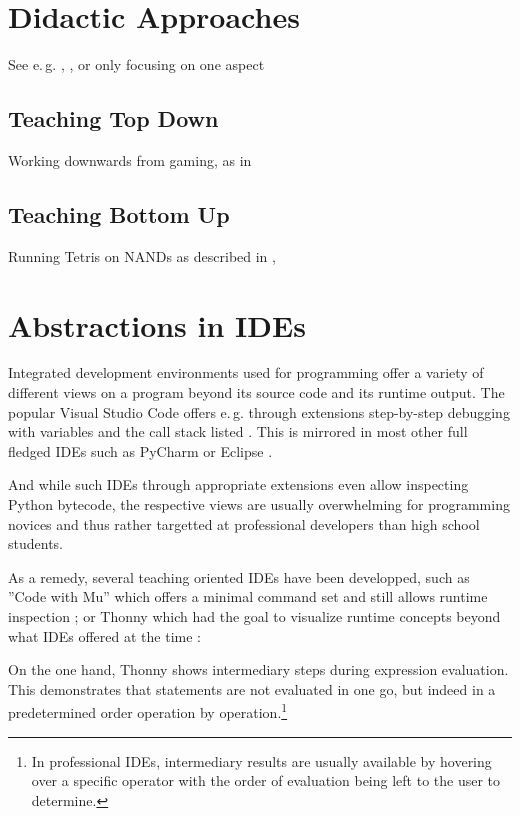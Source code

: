 \section{Didactic Approaches} \label{sc_didactic}
See e.\,g. \cite{Sch11}, \cite{Mod16}, \cite{Har20} or \cite{Lee20} only focusing on one aspect

\subsection{Teaching Top Down}
Working downwards from gaming, as in \cite{Wei16}

\subsection{Teaching Bottom Up}
Running Tetris on NANDs as described in \cite{Cak17}, \cite{Nis21}


\section{Abstractions in IDEs} \label{sc_ides}

Integrated development environments used for programming offer a variety of different views on a program beyond its source code and its runtime output. The popular Visual Studio Code offers e.\,g. through extensions step-by-step debugging with variables and the call stack listed \cite{Mic25}. This is mirrored in most other full fledged IDEs such as PyCharm \citep{Jet25} or Eclipse \citep{Ecl25}.

And while such IDEs through appropriate extensions even allow inspecting Python bytecode, the respective views are usually overwhelming for programming novices and thus rather targetted at professional developers than high school students.

As a remedy, several teaching oriented IDEs have been developped, such as ''Code with Mu'' which offers a minimal command set and still allows runtime inspection \citep{Tol23}; or Thonny which had the goal to visualize runtime concepts beyond what IDEs offered at the time \citep[p. 119]{Ann15}:

On the one hand, Thonny shows intermediary steps during expression evaluation. This demonstrates that statements are not evaluated in one go, but indeed in a predetermined order operation by operation.\footnote{In professional IDEs, intermediary results are usually available by hovering over a specific operator with the order of evaluation being left to the user to determine.}

